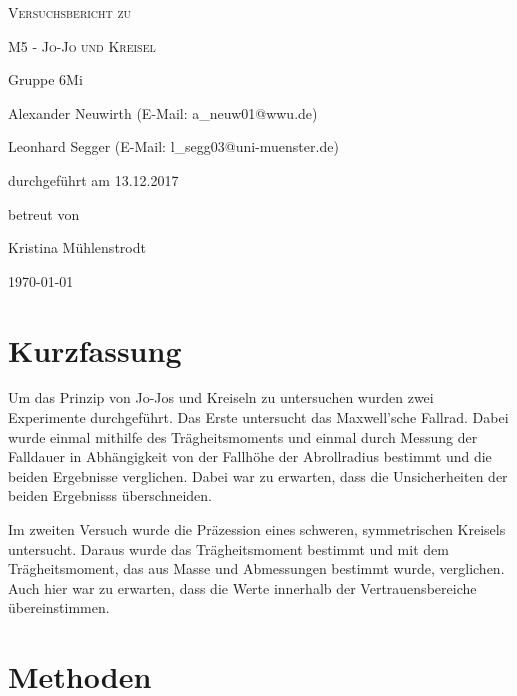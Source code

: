 \documentclass[
	a4paper,
	12pt,
	pagesize,
	ngerman
]{scrartcl}
\begin{document}
	
	\begin{titlepage}
		\centering
		{\scshape\LARGE Versuchsbericht zu \par}
		\vspace{1cm}
		{\scshape\huge M5 - Jo-Jo und Kreisel\par}
		\vspace{2.5cm}
		{\LARGE Gruppe 6Mi \par}
		\vspace{0.5cm}
		
		{\large Alexander Neuwirth (E-Mail: a\_neuw01@wwu.de) \par}
		{\large Leonhard Segger (E-Mail: l\_segg03@uni-muenster.de) \par}
		\vfill
		
		durchgeführt am 13.12.2017\par
		betreut von\par
		{\large Kristina Mühlenstrodt} %
		
		\vfill
		
		{\large \today\par}
	\end{titlepage}
	\tableofcontents
	\newpage

	\section{Kurzfassung}
	Um das Prinzip von Jo-Jos und Kreiseln zu untersuchen wurden zwei Experimente durchgeführt.
	Das Erste untersucht das Maxwell'sche Fallrad.
	Dabei wurde einmal mithilfe des Trägheitsmoments und einmal durch Messung der Falldauer in Abhängigkeit von der Fallhöhe der Abrollradius bestimmt und die beiden Ergebnisse verglichen.
	Dabei war zu erwarten, dass die Unsicherheiten der beiden Ergebnisss überschneiden.
	\par
	Im zweiten Versuch wurde die Präzession eines schweren, symmetrischen Kreisels untersucht. 
	Daraus wurde das Trägheitsmoment bestimmt und mit dem Trägheitsmoment, das aus Masse und Abmessungen bestimmt wurde, verglichen.%
	Auch hier war zu erwarten, dass die Werte innerhalb der Vertrauensbereiche übereinstimmen.
	\section{Methoden}
\end{document}
